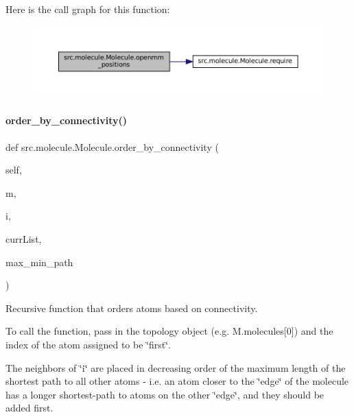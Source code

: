 Here is the call graph for this function\+:
\nopagebreak
\begin{figure}[H]
\begin{center}
\leavevmode
\includegraphics[width=350pt]{classsrc_1_1molecule_1_1Molecule_a466ab9dea14be9117488c6198b0f77cd_cgraph}
\end{center}
\end{figure}
\mbox{\label{classsrc_1_1molecule_1_1Molecule_a5aac5225e3c6c540659410f7a783cd99}} 
\paragraph{\texorpdfstring{order\+\_\+by\+\_\+connectivity()}{order\_by\_connectivity()}}
{\footnotesize\ttfamily def src.\+molecule.\+Molecule.\+order\+\_\+by\+\_\+connectivity (\begin{DoxyParamCaption}\item[{}]{self,  }\item[{}]{m,  }\item[{}]{i,  }\item[{}]{curr\+List,  }\item[{}]{max\+\_\+min\+\_\+path }\end{DoxyParamCaption})}



Recursive function that orders atoms based on connectivity. 

To call the function, pass in the topology object (e.\+g. M.\+molecules\mbox{[}0\mbox{]}) and the index of the atom assigned to be \char`\"{}first\char`\"{}.

The neighbors of \char`\"{}i\char`\"{} are placed in decreasing order of the maximum length of the shortest path to all other atoms -\/ i.\+e. an atom closer to the \char`\"{}edge\char`\"{} of the molecule has a longer shortest-\/path to atoms on the other \char`\"{}edge\char`\"{}, and they should be added first.

